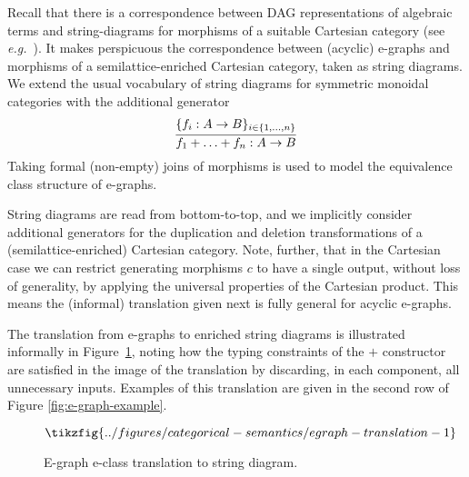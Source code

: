 Recall that there is a correspondence between DAG representations of algebraic terms and  string-diagrams for morphisms of a suitable Cartesian category (see \textit{e.g.}~\cite{ghica-zanassi2023string}).
It makes perspicuous the correspondence between (acyclic) e-graphs and morphisms of a semilattice-enriched Cartesian category, taken as string diagrams.
We extend the usual vocabulary of string diagrams for symmetric monoidal categories with the additional generator
\[
\infer{f_1 + \ldots + f_n: A \to B}{\{f_i: A \to B\}_{i \in \{1,\ldots,n\}}}
\]
Taking formal (non-empty) joins of morphisms is used to model the equivalence class structure of e-graphs.

String diagrams are read from bottom-to-top, and we implicitly consider additional generators for the duplication and deletion transformations of a (semilattice-enriched) Cartesian category.
Note, further, that in the Cartesian case we can restrict generating morphisms $c$ to have a single output,  without loss of generality,  by applying the universal properties of the Cartesian product.  
This means the (informal) translation given next is fully general for acyclic e-graphs. 

The translation from e-graphs to enriched string diagrams is illustrated informally in Figure~\ref{fig:e-graph-to-string},
noting how the typing constraints of the $+$ constructor are satisfied in the image of the translation by discarding, in each component, all unnecessary inputs.
Examples of this translation are given in the second row of Figure \ref{fig:e-graph-example}.

\begin{figure}
\[
    \tikzfig{../figures/categorical-semantics/egraph-translation-1}
\]
\captionsetup{skip=0pt}
\caption{E-graph e-class translation to string diagram.}
\label{fig:e-graph-to-string}
\vspace{-8mm}
\end{figure}


